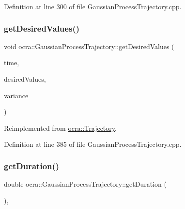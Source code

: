 Definition at line 300 of file Gaussian\+Process\+Trajectory.\+cpp.

\hypertarget{classocra_1_1GaussianProcessTrajectory_a5ae11f8f2525d4b92236b1df20b1a9d7}{}\label{classocra_1_1GaussianProcessTrajectory_a5ae11f8f2525d4b92236b1df20b1a9d7} 
\subsubsection{\texorpdfstring{get\+Desired\+Values()}{getDesiredValues()}\hspace{0.1cm}{\footnotesize\ttfamily [2/2]}}
{\footnotesize\ttfamily void ocra\+::\+Gaussian\+Process\+Trajectory\+::get\+Desired\+Values (\begin{DoxyParamCaption}\item[{double}]{time,  }\item[{Eigen\+::\+Matrix\+Xd \&}]{desired\+Values,  }\item[{Eigen\+::\+Vector\+Xd \&}]{variance }\end{DoxyParamCaption})\hspace{0.3cm}{\ttfamily [virtual]}}



Reimplemented from \hyperlink{classocra_1_1Trajectory_aab6869cf5bc4a7c44eac36a0e49255b9}{ocra\+::\+Trajectory}.



Definition at line 385 of file Gaussian\+Process\+Trajectory.\+cpp.

\hypertarget{classocra_1_1GaussianProcessTrajectory_a03444da89e14a8b77f76800c96d3bab2}{}\label{classocra_1_1GaussianProcessTrajectory_a03444da89e14a8b77f76800c96d3bab2} 
\subsubsection{\texorpdfstring{get\+Duration()}{getDuration()}}
{\footnotesize\ttfamily double ocra\+::\+Gaussian\+Process\+Trajectory\+::get\+Duration (\begin{DoxyParamCaption}{ }\end{DoxyParamCaption})\hspace{0.3cm}{\ttfamily [inline]}, {\ttfamily [virtual]}}



